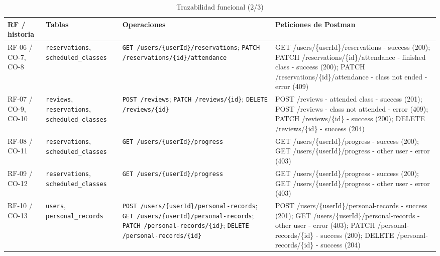 \begin{table}[!t]\caption{Trazabilidad funcional (2/3)}\label{tab:traza-laura-2}\centering\scriptsize\setlength{\tabcolsep}{4pt}
\begin{tabular}{p{}p{}p{}p{}}\toprule
RF / historia & Tablas & Operaciones & Peticiones de Postman \\ \midrule
RF-06 / CO-7, CO-8 & \texttt{reservations}, \texttt{scheduled\_\allowbreak{}classes} & \texttt{GET /\allowbreak{}users/\allowbreak{}\{userId\}/\allowbreak{}reservations}; \texttt{PATCH /\allowbreak{}reservations/\allowbreak{}\{id\}/\allowbreak{}attendance} & GET /\allowbreak{}users/\allowbreak{}\{userId\}/\allowbreak{}reservations - success (200); PATCH /\allowbreak{}reservations/\allowbreak{}\{id\}/\allowbreak{}attendance - finished class - success (200); PATCH /\allowbreak{}reservations/\allowbreak{}\{id\}/\allowbreak{}attendance - class not ended - error (409) \\
RF-07 / CO-9, CO-10 & \texttt{reviews}, \texttt{reservations}, \texttt{scheduled\_\allowbreak{}classes} & \texttt{POST /\allowbreak{}reviews}; \texttt{PATCH /\allowbreak{}reviews/\allowbreak{}\{id\}}; \texttt{DELETE /\allowbreak{}reviews/\allowbreak{}\{id\}} & POST /\allowbreak{}reviews - attended class - success (201); POST /\allowbreak{}reviews - class not attended - error (409); PATCH /\allowbreak{}reviews/\allowbreak{}\{id\} - success (200); DELETE /\allowbreak{}reviews/\allowbreak{}\{id\} - success (204) \\
RF-08 / CO-11 & \texttt{reservations}, \texttt{scheduled\_\allowbreak{}classes} & \texttt{GET /\allowbreak{}users/\allowbreak{}\{userId\}/\allowbreak{}progress} & GET /\allowbreak{}users/\allowbreak{}\{userId\}/\allowbreak{}progress - success (200); GET /\allowbreak{}users/\allowbreak{}\{userId\}/\allowbreak{}progress - other user - error (403) \\
RF-09 / CO-12 & \texttt{reservations}, \texttt{scheduled\_\allowbreak{}classes} & \texttt{GET /\allowbreak{}users/\allowbreak{}\{userId\}/\allowbreak{}progress} & GET /\allowbreak{}users/\allowbreak{}\{userId\}/\allowbreak{}progress - success (200); GET /\allowbreak{}users/\allowbreak{}\{userId\}/\allowbreak{}progress - other user - error (403) \\
RF-10 / CO-13 & \texttt{users}, \texttt{personal\_\allowbreak{}records} & \texttt{POST /\allowbreak{}users/\allowbreak{}\{userId\}/\allowbreak{}personal-records}; \texttt{GET /\allowbreak{}users/\allowbreak{}\{userId\}/\allowbreak{}personal-records}; \texttt{PATCH /\allowbreak{}personal-records/\allowbreak{}\{id\}}; \texttt{DELETE /\allowbreak{}personal-records/\allowbreak{}\{id\}} & POST /\allowbreak{}users/\allowbreak{}\{userId\}/\allowbreak{}personal-records - success (201); GET /\allowbreak{}users/\allowbreak{}\{userId\}/\allowbreak{}personal-records - other user - error (403); PATCH /\allowbreak{}personal-records/\allowbreak{}\{id\} - success (200); DELETE /\allowbreak{}personal-records/\allowbreak{}\{id\} - success (204) \\
\bottomrule\end{tabular}\end{table}
